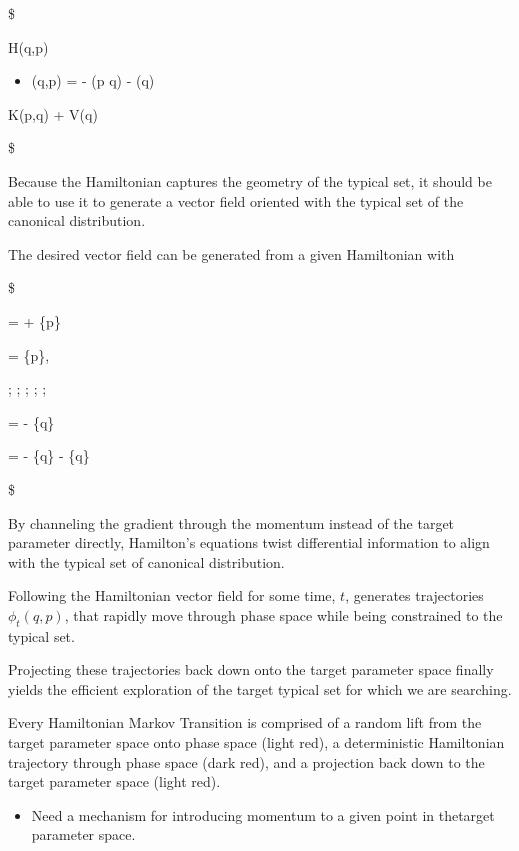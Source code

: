 \documentclass[
]{book}
\providecommand{\tightlist}{%
  \setlength{\itemsep}{0pt}\setlength{\parskip}{0pt}}
\begin{document}
\$

H(q,p)

\equiv

\begin{itemize}
\tightlist
\item
  \log \pi(q,p) = - \log \pi(p \vert q) - \log \pi(q)
\end{itemize}

\equiv K(p,q) + V(q)

\$

Because the Hamiltonian captures the geometry of the typical set, it should be able to use it to generate a vector field oriented with the typical set of the canonical distribution.

The desired vector field can be generated from a given Hamiltonian with

\$


= +  \{\partial p\}

=  \{\partial p\},

; ; ; ; ;


= -  \{\partial q\}

= - \{\partial q\} - \{\partial q\}

\$

By channeling the gradient through the momentum instead of the target parameter directly, Hamilton's equations twist differential information to align with the typical set of canonical distribution.

Following the Hamiltonian vector field for some time, \(t\), generates trajectories \(\phi_t (q, p)\), that rapidly move through phase space while being constrained to the typical set.

Projecting these trajectories back down onto the target parameter space finally yields the efficient exploration of the target typical set for which we are searching.

Every Hamiltonian Markov Transition is comprised of a random lift from the target parameter space onto phase space (light red), a deterministic Hamiltonian trajectory through phase space (dark red), and a projection back down to the target parameter space (light red).

\begin{itemize}
\tightlist
\item
  Need a mechanism for introducing momentum to a given point in thetarget parameter space.
\end{itemize}
\end{document}
